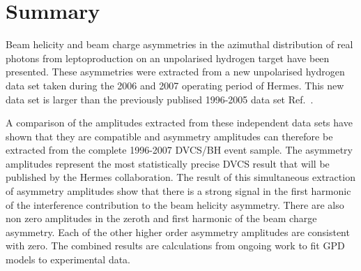 \section{Summary}

Beam helicity and beam charge asymmetries in the azimuthal distribution of real photons from leptoproduction on an unpolarised hydrogen target have been presented. These asymmetries were extracted from a new unpolarised hydrogen data set taken during the 2006 and 2007 operating period of H{\sc ermes}.  This new data set is larger than the previously publised 1996-2005 data set Ref.~\cite{Air09}.

A comparison of the amplitudes extracted from these independent data sets have shown that they are compatible and asymmetry amplitudes can therefore be extracted from the complete 1996-2007 DVCS/BH event sample. The  asymmetry amplitudes represent the most statistically precise DVCS result that will be published by the H{\sc ermes} collaboration. The result of this simultaneous extraction of asymmetry amplitudes show that there is a strong signal in the first harmonic of the interference contribution to the beam helicity asymmetry. There are also non zero amplitudes in the zeroth and first harmonic of the beam charge asymmetry. Each of the other higher order asymmetry amplitudes are consistent with zero. The combined results are  calculations from ongoing work to fit GPD models to experimental data. 


